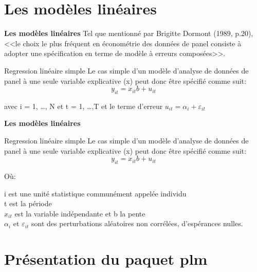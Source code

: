 \documentclass{beamer}
\begin{document}
\section{\textbf{Les mod\`eles lin\'eaires}}
\begin{frame}{\textbf{Les mod\`eles lin\'eaires}}
Tel que mentionn\'e par  Brigitte Dormont (1989, p.20), <<le choix le plus fr\'equent en \'econom\'etrie des donn\'ees de panel consiste \`a adopter une sp\'ecification en terme de mod\`ele  \`a erreurs compos\'ees>>. \newline

\begin{block}{Regression lin\'eaire simple}
Le cas simple d'un mod\`ele d'analyse de donn\'ees de panel \`a une seule variable explicative (x) peut donc \^etre sp\'ecifi\'e comme suit: 
    \begin{equation*}
y_{it}=x_{it}b + u_{it}
    \end{equation*}
\end{block}
avec i = 1, \ldots , N et t = 1, \ldots ,T 
et le terme d'erreur $u_{it} = \alpha_i + \varepsilon_{it}$
\end{frame}
\begin{frame}{\textbf{Les mod\`eles lin\'eaires}}
\begin{block}{Regression lin\'eaire simple}
Le cas simple d'un mod\`ele d'analyse de donn\'ees de panel \`a une seule variable explicative (x) peut donc \^etre sp\'ecifi\'e comme suit: 
    \begin{equation*}
y_{it}=x_{it}b + u_{it}
    \end{equation*}
\end{block}
O\`u: 
\begin{description} 
\item[i est une unit\'e statistique commun\'ement appel\'ee individu] 
\item[t est la p\'eriode]
\item[$x_{it}$ est la variable ind\'ependante et b la pente]
\item[$\alpha_i$ et $\varepsilon_{it}$ sont des perturbations al\'eatoires non corr\'el\'ees, d'esp\'erances nulles.]
\end{description}
\end{frame}
\section{\textbf{Pr\'esentation du paquet plm}}
\end{document}
